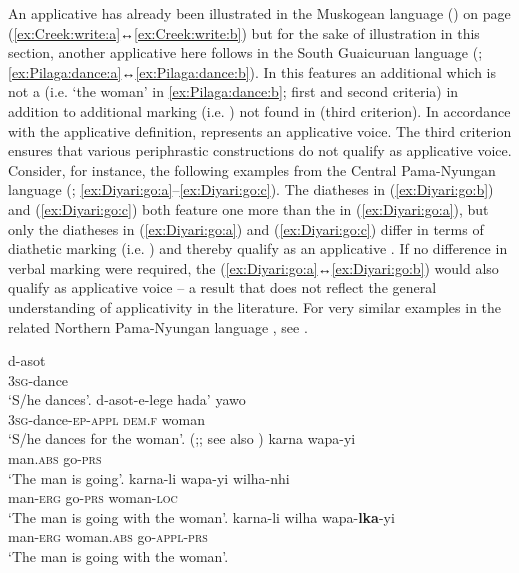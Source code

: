 An applicative  has already been illustrated in the Muskogean language  () on page \pageref{ex:Creek:write:a} (\ref{ex:Creek:write:a}↔\ref{ex:Creek:write:b}) but for the sake of illustration in this section, another applicative  here follows in the South Guaicuruan language  (; \ref{ex:Pilaga:dance:a}↔\ref{ex:Pilaga:dance:b}). In this   features an additional  which is not a  (i.e. ‘the woman’ in \ref{ex:Pilaga:dance:b}; first and second criteria) in addition to additional marking (i.e. ) not found in  (third criterion). In accordance with the applicative definition,  represents an applicative voice. The third criterion ensures that various periphrastic constructions do not qualify as applicative voice. Consider, for instance, the following examples from the Central Pama-Nyungan language  (; \ref{ex:Diyari:go:a}--\ref{ex:Diyari:go:c}). The diatheses in (\ref{ex:Diyari:go:b}) and (\ref{ex:Diyari:go:c}) both feature one  more than the  in (\ref{ex:Diyari:go:a}), but only the diatheses in (\ref{ex:Diyari:go:a}) and (\ref{ex:Diyari:go:c}) differ in terms of diathetic marking (i.e. ) and thereby qualify as an applicative . If no difference in verbal marking were required, the  (\ref{ex:Diyari:go:a}↔\ref{ex:Diyari:go:b}) would also qualify as applicative voice -- a result that does not reflect the general understanding of applicativity in the literature. For very similar examples in the related Northern Pama-Nyungan language , see \citet[109]{dixon:1977}.

\ea {} \citep[318]{vidal:2001}
\ea\label{ex:Pilaga:dance:a}
	\gll	d-asot				\\
			\textsc{3sg}-dance	\\
	\glt	‘S/he dances’.
\ex\label{ex:Pilaga:dance:b}
	\gll	d-asot-e-lege 							hada’ 			yawo	\\
			\textsc{3sg}-dance-\textsc{ep-appl} 	\textsc{dem.f} 	woman	\\
	\glt	‘S/he dances for the woman’.
	\z 
\z
\ea {} (\citealt[4f.]{austin:2005};; see also \citealt[264]{kittila:2002})
\ea\label{ex:Diyari:go:a}
	\gll	karna				wapa-yi			\\
			man.\textsc{abs}	go-\textsc{prs}	\\
	\glt	‘The man is going’.
\ex\label{ex:Diyari:go:b}
	\gll	karna-li			wapa-yi			wilha-nhi			\\
			man-\textsc{erg}	go-\textsc{prs}	woman-\textsc{loc}	\\
	\glt	‘The man is going with the woman’.
\ex\label{ex:Diyari:go:c}
	\gll	karna-li			wilha				wapa-\textbf{lka}-yi	\\
			man-\textsc{erg}	woman.\textsc{abs}	go-\textsc{appl-prs}	\\
	\glt	‘The man is going with the woman’.
	\z 
\z

